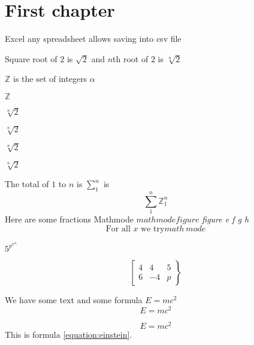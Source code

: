 \documentclass[12pt,a4paper]{beamer}
\renewcommand{\int}{\mathbb{Z}}
\newcommand{\sqrtntwo}{\sqrt[n]{2}}
\begin{document}
\tableofcontents



\chapter{First chapter}

Excel any spreadsheet  allows saving into csv file


Square root of $2$ is $\sqrt{2}$ and $n$th root of $2$ is $\sqrt[n]{2}$

\cite{suggestivename:someother} 





$\mathbb{Z}$ is the set of integers $\alpha$ 

$\int$

$\sqrtntwo$

$\sqrtntwo$

$\sqrtntwo$

$\sqrtntwo$

The total of $1$ to $n$ is $\sum_1^n$ is
\[
\sum_1^n 
\int_1^n 
\]
Here are some fractions  
Mathmode $mathmode figure $  {\it figure e f g h}
\[
\mbox{For all $x$ we try} math~mode
\]


$5^{p^{7^{4_6}}}$

\[
\left[ \begin{array}{rrr}
4 & 4  &5 \\ 6 & -4 & p \end{array} \right\} 
\]

We have some text and some formula $E = m c^2$ 
\[
E =  m c ^ 2 
\]

\begin{equation} \label{equation:einstein}
E = m c^2 
\end{equation}
This is formula \ref{equation:einstein}.

\vspace*{2cm}
\end{document}
